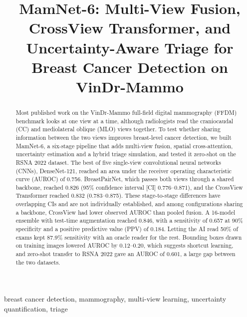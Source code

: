 \documentclass[conference]{IEEEtran}
\begin{document}
\title{MamNet-6: Multi-View Fusion, CrossView Transformer, and Uncertainty-Aware Triage for Breast Cancer Detection on VinDr-Mammo}

\author{
}

\maketitle

\begin{abstract}
Most published work on the VinDr-Mammo full-field digital mammography (FFDM) benchmark looks at one view at a time, although radiologists read the craniocaudal (CC) and mediolateral oblique (MLO) views together. To test whether sharing information between the two views improves breast-level cancer detection, we built MamNet-6, a six-stage pipeline that adds multi-view fusion, spatial cross-attention, uncertainty estimation and a hybrid triage simulation, and tested it zero-shot on the RSNA 2022 dataset. The best of five single-view convolutional neural networks (CNNs), DenseNet-121, reached an area under the receiver operating characteristic curve (AUROC) of 0.756. BreastPairNet, which passes both views through a shared backbone, reached 0.826 (95\% confidence interval [CI] 0.776--0.871), and the CrossView Transformer reached 0.832 (0.783--0.875). These stage-to-stage differences have overlapping CIs and are not individually established, and among configurations sharing a backbone, CrossView had lower observed AUROC than pooled fusion. A 16-model ensemble with test-time augmentation reached 0.846, with a sensitivity of 0.657 at 90\% specificity and a positive predictive value (PPV) of 0.184. Letting the AI read 50\% of exams kept 87.9\% sensitivity with an oracle reader for the rest. Bounding boxes drawn on training images lowered AUROC by 0.12--0.20, which suggests shortcut learning, and zero-shot transfer to RSNA 2022 gave an AUROC of 0.601, a large gap between the two datasets.
\end{abstract}

\begin{IEEEkeywords}
breast cancer detection, mammography, multi-view learning, uncertainty quantification, triage
\end{IEEEkeywords}
\end{document}
